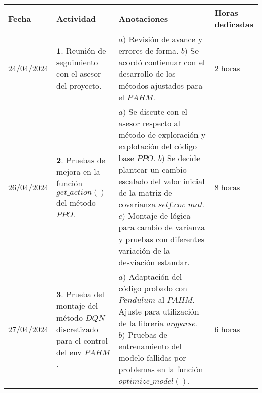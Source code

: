 \documentclass[12pt]{article}
\begin{document}
\begin{minipage}[h]{\textwidth}
	\centering
	\begin{tabularx}{\textwidth}{|p{2cm}|X|X|p{2cm}|} 
		\hline
		\rowcolor{encabezado}
		\textbf{Fecha} & 
		\textbf{Actividad} & 
		\textbf{Anotaciones} & 
		\textbf{Horas dedicadas} \\ \hline
	 	24/04/2024 & 
	 	$\mathbf{1}.$ Reunión de seguimiento con el asesor del proyecto. & 
	 	$a)$ Revisión de avance y errores de forma. \newline
	 	$b)$ Se acordó contienuar con el desarrollo de los métodos ajustados para el $PAHM$. \newline & 
	 	2 horas \\
		26/04/2024 & 
	 	$\mathbf{2}.$ Pruebas de mejora en la función $get\_action()$ del método $PPO$. &
	 	$a)$ Se discute con el asesor respecto al método de exploración y explotación del código base $PPO$. \newline
	 	$b)$ Se decide plantear un cambio escalado del valor inicial de la matriz de covarianza $self.cov\_mat$. \newline
	 	$c)$ Montaje de lógica para cambio de varianza y pruebas con diferentes variación de la desviación estandar. \newline & 
	 	8 horas \\
	 	27/04/2024 & 
	 	$\mathbf{3}.$ Prueba del montaje del método $DQN$ discretizado para el control del env $PAHM$. &
	 	$a)$ Adaptación del código probado con $Pendulum$ al $PAHM$. Ajuste para utilización de la libreria \textit{argparse}. \newline
	 	$b)$ Pruebas de entrenamiento del modelo fallidas por problemas en la función $optimize\_ model()$. \newline & 
	 	6 horas \\

	 	\hline
	\end{tabularx}
\end{minipage}	 	
	 	
\end{document}
